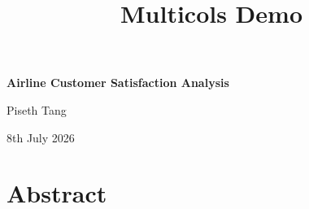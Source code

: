 \documentclass[11pt]{article}
\title{Multicols Demo}
\begin{document}
\begin{titlepage}
    \centering
    \vspace*{\fill}

    {\Huge\bfseries Airline Customer Satisfaction Analysis\par}

    \vspace{1.5cm}

    {\LARGE Piseth Tang\par}

    \vspace{0.5cm}

    {\large 8th July 2026\par}

    \vspace*{\fill}
\end{titlepage}
\clearpage\thispagestyle{empty}




\newpage
\tableofcontents



\section*{\centering Abstract}
\end{document}
